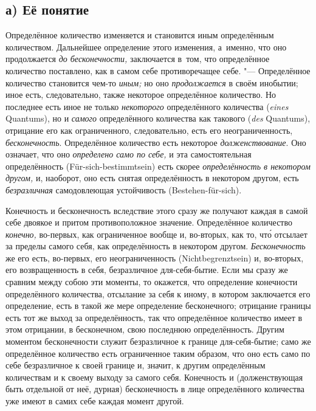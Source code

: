 
\subsection[а) Её понятие]{а) Её понятие}

Определённое количество изменяется и становится иным определённым
количеством. Дальнейшее определение этого изменения, а~именно, что оно
продолжается {\em до бесконечности,} заключается в~том, что определённое
количество поставлено, как в самом себе противоречащее себе. "--- Определённое
количество становится чем-то {\em иным;} но оно {\em продолжается} в своём
инобытии; иное есть, следовательно, также некоторое определённое количество.
Но последнее есть иное не только {\em некоторого} определённого количества ({\em \!eines} Quantums),
но и {\em самого} определённого количества как такового ({\em \!des} Quantums), отрицание его как
ограниченного, следовательно, есть его неограниченность, {\em бесконечность}.
Определённое количество есть некоторое {\em долженствование}. Оно означает, что
оно {\em определено само по себе,} и эта самостоятельная определённость
(Für-sich-bestimmt\-sein) есть скорее {\em определённость в некотором другом,} и,
наоборот, оно есть снятая определённость в некотором другом, есть
{\em безразличная} самодовлеющая устойчивость (Bestehen-für-sich).

Конечность и бесконечность вследствие этого сразу же получают каждая в самой
себе двоякое и притом противоположное значение. Определённое количество
{\em конечно,} во-первых, как ограниченное вообще и, во-вторых, как то, чт\'{о}
отсылает за пределы самого себя, как определённость в некотором другом.
{\em Бесконечность} же его есть, во-первых, его неограниченность (Nicht\-begrenzt\-sein) и, во-вторых,
его возвращенность в себя, безразличное для-себя-бытие. Если мы сразу же
сравним между собою эти моменты, то окажется, что определение конечности
определённого количества, отсылание за себя к иному, в котором заключается его
определение, есть в такой же мере определение бесконечного; отрицание границы
есть тот же выход за определённость, так что определённое количество имеет
в этом отрицании, в бесконечном, свою последнюю определённость. Другим моментом
бесконечности служит безразличное к границе для-себя-бытие; само же
определённое количество есть ограниченное таким образом, что оно есть само по
себе безразличное к своей границе и, значит, к другим определённым количествам
и к своему выходу за самого себя. Конечность и (долженствующая быть отдельной
от неё, дурная) бесконечность в лице определённого количества уже имеют в самих
себе каждая момент другой.

